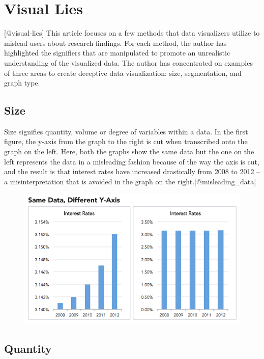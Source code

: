 \documentclass[]{book}
\theoremstyle{definition}
\theoremstyle{definition}
\theoremstyle{definition}
\theoremstyle{remark}
\begin{document}
\section{Visual Lies}\label{visual-lies}

{[}@visual-lies{]} This article focuses on a few methods that data
visualizers utilize to mislead users about research findings. For each
method, the author has highlighted the signifiers that are manipulated
to promote an unrealistic understanding of the visualized data. The
author has concentrated on examples of three areas to create deceptive
data visualization: size, segmentation, and graph type.

\subsection{Size}\label{size}

Size signifies quantity, volume or degree of variables within a data. In
the first figure, the y-axis from the graph to the right is cut when
transcribed onto the graph on the left. Here, both the graphs show the
same data but the one on the left represents the data in a misleading
fashion because of the way the axis is cut, and the result is that
interest rates have increased drastically from 2008 to 2012 -- a
misinterpretation that is avoided in the graph on the
right.{[}@misleading\_data{]}

\begin{figure}
\centering
\includegraphics{images/Size1.png}
\caption{}
\end{figure}

\subsection{Quantity}\label{quantity}
\end{document}
